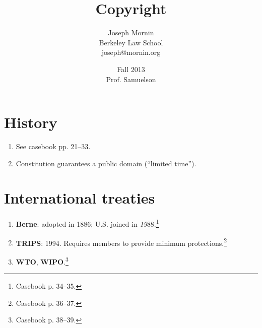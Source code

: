 \documentclass[letterpaper,titlepage]{article}
\begin{document}
\title{Copyright}
\author{Joseph Mornin\\Berkeley Law School\\joseph@mornin.org}
\date{Fall 2013\\Prof. Samuelson}
\maketitle
\tableofcontents
\pagebreak


\newpage

\newpage


\section{History}

\begin{enumerate}
    \item See casebook pp. 21--33.
    \item Constitution guarantees a public domain (``limited time'').
\end{enumerate}

\section{International treaties}

\begin{enumerate}
    \item \textbf{Berne}: adopted in 1886; U.S. joined in 
    \emph{19}88.\footnote{Casebook p. 34--35.}
    \item \textbf{TRIPS}: 1994. Requires members to provide minimum 
    protections.\footnote{Casebook p. 36--37.}
    \item \textbf{WTO}, \textbf{WIPO}.\footnote{Casebook p. 38--39.}
\end{enumerate}
\end{document}
